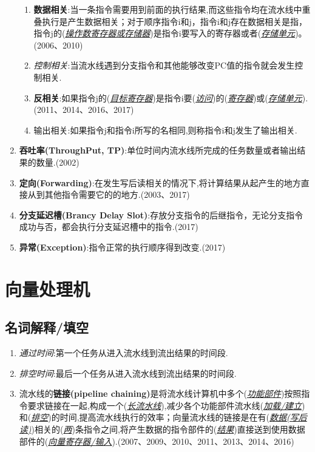 \documentclass[a4paper]{ctexart}
\newcommand{\blank}[1]{(\emph{\underline{#1}})}
\begin{document}
\begin{enumerate}
\begin{enumerate}
    \item \textbf{数据相关}:当一条指令需要用到前面的执行结果,而这些指令均在流水线中重叠执行是产生数据相关；对于顺序指令i和j，指令i和j存在数据相关是指，指令j的\blank{操作数寄存器或存储器}是指令i要写入的寄存器或者\blank{存储单元}。(2006、2010)
    \item \emph{控制相关}:当流水线遇到分支指令和其他能够改变PC值的指令就会发生控制相关.
    \item \textbf{反相关}:如果指令j的\blank{目标寄存器}是指令i要\blank{访问}的\blank{寄存器}或\blank{存储单元}.(2011、2014、2016、2017)
    \item 输出相关:如果指令j和指令i所写的名相同,则称指令i和j发生了输出相关.
  \end{enumerate}
  \item \textbf{吞吐率(ThroughPut, TP)}:单位时间内流水线所完成的任务数量或者输出结果的数量.(2002)
  \item \textbf{定向(Forwarding)}:在发生写后读相关的情况下,将计算结果从起产生的地方直接从到其他指令需要它的的地方.(2003、2017)
  \item \textbf{分支延迟槽(Brancy Delay Slot)}:存放分支指令的后继指令，无论分支指令成功与否，都会执行分支延迟槽中的指令.(2017)
  \item \textbf{异常(Exception)}:指令正常的执行顺序得到改变.(2017)
\end{enumerate}

\newpage
\section{向量处理机}
\subsection{名词解释/填空}
\begin{enumerate}
  \item \emph{通过时间}:第一个任务从进入流水线到流出结果的时间段.
  \item \emph{排空时间}:最后一个任务从进入流水线到流出结果的时间段.
  \item 流水线的\textbf{链接(pipeline chaining)}是将流水线计算机中多个(\emph{\underline{功能部件}})按照指令要求链接在一起,构成一个\blank{长流水线},减少各个功能部件流水线(\emph{\underline{加载/建立}})和\blank{排空}的时间,提高流水线执行的效率；向量流水线的链接是在有\blank{数据(写后读)}相关的\blank{两}条指令之间,将产生数据的指令部件的\blank{结果}直接送到使用数据部件的\blank{向量寄存器/输入}.(2007、2009、2010、2011、2013、2014、2016)
\end{enumerate}
\end{document}
